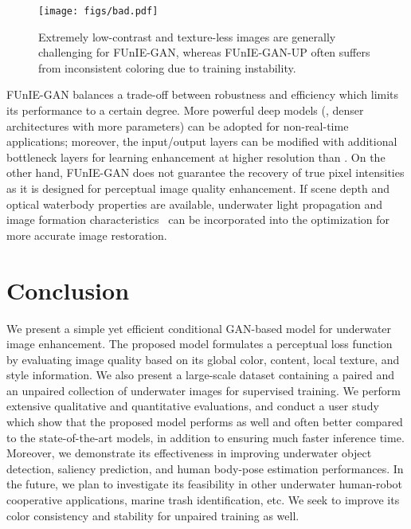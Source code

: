 \documentclass[10pt,twocolumn,letterpaper]{article}
\begin{document}
\begin{figure}

    \centering
        \texttt{[image: figs/bad.pdf]}
    \caption{Extremely low-contrast and texture-less images are generally challenging for FUnIE-GAN, whereas FUnIE-GAN-UP often suffers from inconsistent coloring due to training instability.}
    \label{fig:bad}
    \vspace{-2mm}
\end{figure}


FUnIE-GAN balances a trade-off between robustness and efficiency which limits its performance to a certain degree. More powerful deep models (\ie, denser architectures with more parameters) can be adopted for non-real-time applications; moreover, the input/output layers can be modified with additional bottleneck layers for learning enhancement at higher resolution than . On the other hand, FUnIE-GAN does not guarantee the recovery of true pixel intensities as it is designed for perceptual image quality enhancement. If scene depth and optical waterbody properties are available, underwater light propagation and image formation characteristics~\cite{akkaynak2018revised,berman2018underwater,bryson2016true} can be incorporated into the optimization for more accurate image restoration. 


 \section{Conclusion}
We present a simple yet efficient conditional GAN-based model for underwater image enhancement. The proposed model formulates a perceptual loss function by evaluating image quality based on its global color, content, local texture, and style information. We also present a large-scale dataset containing a paired and an unpaired collection of underwater images for supervised training. We perform extensive qualitative and quantitative evaluations, and conduct a user study which show that the proposed model performs as well and often better compared to the state-of-the-art models, in addition to ensuring much faster inference time. Moreover, we demonstrate its effectiveness in improving underwater object detection, saliency prediction, and human body-pose estimation performances. In the future, we plan to investigate its feasibility in other underwater human-robot cooperative applications, marine trash identification, etc. We seek to improve its color consistency and stability for unpaired training as well.  


{\small


}
\end{document}
